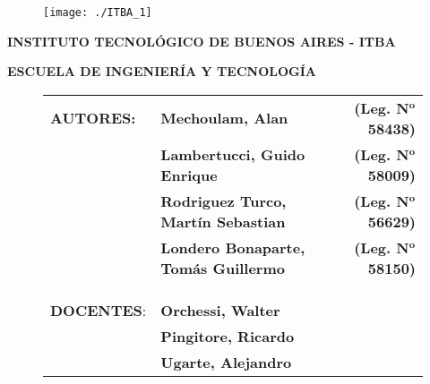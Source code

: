 \begin{titlepage}


\begin{figure}[H]
	\texttt{[image: ./ITBA\_1]}
\end{figure}

\vspace*{1.5cm}

\noindent \textbf{INSTITUTO TECNOLÓGICO DE BUENOS AIRES - ITBA}

\noindent \textbf{ESCUELA DE INGENIERÍA Y TECNOLOGÍA}

\vspace*{4cm}


\vspace*{2.5cm}

\begin{figure}[H]
\begin{adjustwidth}{-1cm}{}
\begin{tabular}{llr} 
	\textbf{AUTORES:} & \textbf{Mechoulam, Alan}  &  \textbf{(Leg. N}$\mathbf{^o}$ \textbf{58438)}\\
	 & \textbf{Lambertucci, Guido Enrique} & \textbf{(Leg. N}$\mathbf{^o}$ \textbf{58009)} \\
	 & \textbf{Rodriguez Turco, Martín Sebastian} & \textbf{(Leg. N}$\mathbf{^o}$ \textbf{56629)} \\
	 & \textbf{Londero Bonaparte, Tomás Guillermo} & \textbf{(Leg. N}$\mathbf{^o}$ \textbf{58150)} \\
 &  & \\
 &  & \\
 &  & \\
	\textbf{DOCENTES}: & \textbf{Orchessi, Walter} & \\
	 & \textbf{Pingitore, Ricardo} & \\
	 & \textbf{Ugarte, Alejandro} & \\
\end{tabular}
\end{adjustwidth}
\end{figure}

\end{titlepage}
